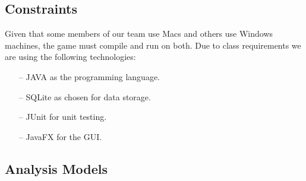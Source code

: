 \documentclass[10pt, a4paper]{article}
\begin{document}
%		
%		
%	
%		
	
	\subsection{Constraints}
	
	Given that some members of our team use Macs and others use Windows machines, the game must compile and run on both. Due to class requirements we are using the following technologies:
	\begin{itemize}
		\item[--] JAVA as the programming language.
		\item[--] SQLite as chosen for data storage.
		\item[--] JUnit for unit testing.
		\item[--] JavaFX for the GUI.
	\end{itemize}
	
	\subsection{Analysis Models}
	
\end{document}
